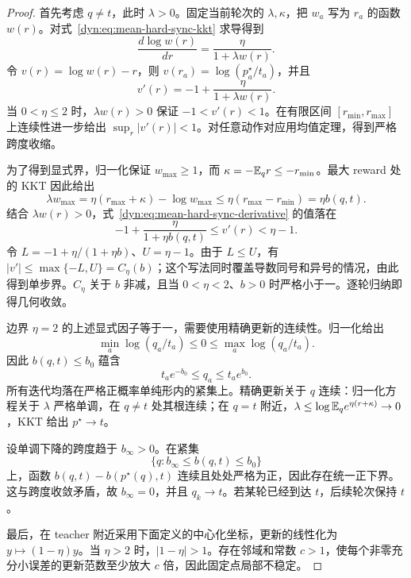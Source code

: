\begin{proof}
首先考虑 $q\ne t$，此时 $\lambda>0$。固定当前轮次的 $\lambda,\kappa$，把 $w_a$ 写为 $r_a$ 的函数 $w(r)$。对式~\eqref{dyn:eq:mean-hard-sync-kkt} 求导得到
\begin{equation*}
 \frac{d\log w(r)}{dr}=\frac{\eta}{1+\lambda w(r)}.
\end{equation*}
令 $v(r)=\log w(r)-r$，则 $v(r_a)=\log(p_a^\star/t_a)$，并且
\begin{equation}
 v'(r)=-1+\frac{\eta}{1+\lambda w(r)}.
 \label{dyn:eq:mean-hard-sync-derivative}
\end{equation}
当 $0<\eta\le2$ 时，$\lambda w(r)>0$ 保证 $-1<v'(r)<1$。在有限区间 $[r_{\min},r_{\max}]$ 上连续性进一步给出 $\sup_r|v'(r)|<1$。对任意动作对应用均值定理，得到严格跨度收缩。

为了得到显式界，归一化保证 $w_{\max}\ge1$，而 $\kappa=-\mathbb E_qr\le-r_{\min}$。最大 reward 处的 KKT 因此给出
\begin{equation*}
 \lambda w_{\max}
 =\eta(r_{\max}+\kappa)-\log w_{\max}
 \le\eta(r_{\max}-r_{\min})=\eta b(q,t).
\end{equation*}
结合 $\lambda w(r)>0$，式~\eqref{dyn:eq:mean-hard-sync-derivative} 的值落在
\begin{equation*}
 -1+\frac{\eta}{1+\eta b(q,t)}\le v'(r)<\eta-1.
\end{equation*}
令 $L=-1+\eta/(1+\eta b)$、$U=\eta-1$。由于 $L\le U$，有 $|v'|\le\max\{-L,U\}=C_\eta(b)$；这个写法同时覆盖导数同号和异号的情况，由此得到单步界。$C_\eta$ 关于 $b$ 非减，且当 $0<\eta<2$、$b>0$ 时严格小于一。逐轮归纳即得几何收敛。

边界 $\eta=2$ 的上述显式因子等于一，需要使用精确更新的连续性。归一化给出
\begin{equation*}
 \min_a\log(q_a/t_a)\le0\le\max_a\log(q_a/t_a).
\end{equation*}
因此 $b(q,t)\le b_0$ 蕴含
\begin{equation*}
 t_ae^{-b_0}\le q_a\le t_ae^{b_0}.
\end{equation*}
所有迭代均落在严格正概率单纯形内的紧集上。精确更新关于 $q$ 连续：归一化方程关于 $\lambda$ 严格单调，在 $q\ne t$ 处其根连续；在 $q=t$ 附近，$\lambda\le\log\mathbb E_qe^{\eta(r+\kappa)}\to0$，KKT 给出 $p^\star\to t$。

设单调下降的跨度趋于 $b_\infty>0$。在紧集
\begin{equation*}
 \{q:b_\infty\le b(q,t)\le b_0\}
\end{equation*}
上，函数 $b(q,t)-b(p^\star(q),t)$ 连续且处处严格为正，因此存在统一正下界。这与跨度收敛矛盾，故 $b_\infty=0$，并且 $q_k\to t$。若某轮已经到达 $t$，后续轮次保持 $t$。

最后，在 teacher 附近采用下面定义的中心化坐标，更新的线性化为 $y\mapsto(1-\eta)y$。当 $\eta>2$ 时，$|1-\eta|>1$。存在邻域和常数 $c>1$，使每个非零充分小误差的更新范数至少放大 $c$ 倍，因此固定点局部不稳定。
\end{proof}

